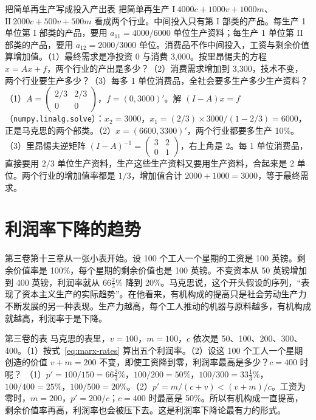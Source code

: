 \begin{example}{把简单再生产写成投入产出表}\label{ex:marx-io}
把简单再生产 $\text{I}\ 4000c+1000v+1000m$、$\text{II}\ 2000c+500v+500m$ 看成两个行业。中间投入只有第 I 部类的产品。每生产 1 单位第 I 部类的产品，要用 $a_{11}=4000/6000$ 单位生产资料；每生产 1 单位第 II 部类的产品，要用 $a_{12}=2000/3000$ 单位。消费品不作中间投入，工资与剩余价值算增加值。（1）最终需求是净投资 0 与消费 3,000。按里昂惕夫的方程 $x=Ax+f$，两个行业的产出是多少？（2）消费需求增加到 3,300，技术不变，两个行业要生产多少？（3）每多 1 单位消费品，全社会要多生产多少生产资料？
\solution （1）$A=\begin{pmatrix}2/3&2/3\\0&0\end{pmatrix}$，$f=(0,3000)'$。解 $(I-A)x=f$（\texttt{numpy.linalg.solve}）：$x_2=3000$，$x_1=(2/3)\times3000/(1-2/3)=6000$，正是马克思的两个部类。（2）$x=(6600,3300)'$，两个行业都要多生产 10\%。（3）里昂惕夫逆矩阵 $(I-A)^{-1}=\begin{pmatrix}3&2\\0&1\end{pmatrix}$，右上角是 2。每 1 单位消费品，直接要用 $2/3$ 单位生产资料，生产这些生产资料又要用生产资料，合起来是 2 单位。两个行业的增加值率都是 $1/3$，增加值合计 $2000+1000=3000$，等于最终需求。
\end{example}

\section{利润率下降的趋势}\label{sec:marx-profit}

第三卷第十三章从一张小表开始。设 100 个工人一个星期的工资是 100 英镑\cite{marx1894}。剩余价值率是 100\%，每个星期的剩余价值也是 100 英镑。不变资本从 50 英镑增加到 400 英镑，利润率就从 $66\tfrac{2}{3}\%$ 降到 20\%。马克思说，这个开头假设的序列，“表现了资本主义生产的实际趋势”\cite{marx1894}。在他看来，有机构成的提高只是社会劳动生产力不断发展的另一种表现\cite{marx1894}。生产力越高，每个工人推动的机器与原料越多，有机构成就越高，利润率于是下降。

\begin{example}{第三卷的表}\label{ex:marx-profit}
马克思的表里，$v=100$，$m=100$，$c$ 依次是 50、100、200、300、400\cite{marx1894}。（1）按式~\eqref{eq:marx-rates} 算出五个利润率。（2）设这 100 个工人一个星期创造的价值 $v+m=200$ 不变，即使工资降到零，利润率最高是多少？$c=400$ 时呢？
\solution （1）$p'=100/150=66\tfrac{2}{3}\%$，$100/200=50\%$，$100/300=33\tfrac{1}{3}\%$，$100/400=25\%$，$100/500=20\%$。（2）$p'=m/(c+v)<(v+m)/c$。工资为零时，$m=200$，$p'=200/c$；$c=400$ 时最高是 50\%。所以有机构成一直提高，剩余价值率再高，利润率也会被压下去。这是利润率下降论最有力的形式。
\end{example}

